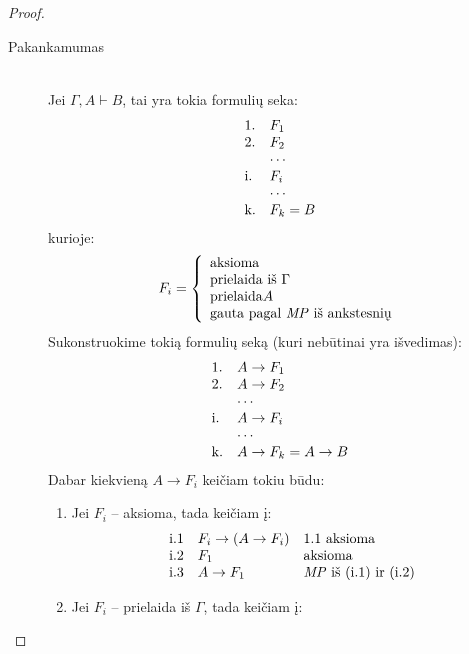 \begin{prop}
\begin{proof}
\begin{description}
      \item[Pakankamumas] \hfill \\
      Jei $\Gamma,A \vdash B$, tai yra tokia formulių seka:
      \[
      \begin{array}{l l}
        \text{1.} & F_{1}     \\
        \text{2.} & F_{2}     \\
        {}        & \cdots    \\
        \text{i.} & F_{i}     \\
        {}        & \cdots    \\
        \text{k.} & F_{k} = B \\
      \end{array}
      \]
      kurioje:
      \[
      F_{i} = \left\{
      \begin{array}{l}
        \text{aksioma} \\
        \text{prielaida iš } \Gamma \\
        \text{prielaida} A \\
        \text{gauta pagal \emph{MP} iš ankstesnių}
      \end{array} \right.
      \]
      Sukonstruokime tokią formulių seką (kuri nebūtinai yra išvedimas):
      \[
      \begin{array}{l l}
        \text{1.} & A \to F_{1}     \\
        \text{2.} & A \to F_{2}     \\
        {}        & \cdots    \\
        \text{i.} & A \to F_{i}     \\
        {}        & \cdots    \\
        \text{k.} & A \to F_{k} = A \to B \\
      \end{array}
      \]
      Dabar kiekvieną $A \to F_{i}$ keičiam tokiu būdu:
      \begin{enumerate}
        \item Jei $F_{i}$ – aksioma, tada keičiam į:
          \[
          \begin{array}{l l l}
            \text{i.1} & F_{i} \to (A \to F_{i}) & \text{1.1 aksioma} \\
            \text{i.2} & F_{1} & \text{aksioma} \\
            \text{i.3} & A \to F_{1} & \text{\emph{MP} iš (i.1) ir (i.2)}\\
          \end{array}
          \]
        \item Jei $F_{i}$ – prielaida iš $\Gamma$, tada keičiam į:

\end{enumerate}
\end{description}
\end{proof}
\end{prop}
